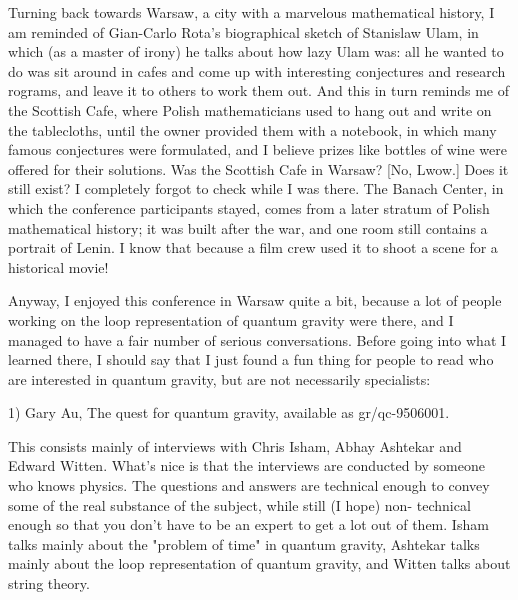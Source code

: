 Turning back towards Warsaw, a city with a marvelous mathematical 
history, I am reminded of Gian-Carlo Rota's biographical sketch of 
Stanislaw Ulam, in which (as a master of irony) he talks about how lazy
Ulam was: all he wanted to do was sit around in cafes and come up with
interesting conjectures and research rograms, and leave it to others to 
work them out.  And this in turn reminds me of the Scottish Cafe, where 
Polish mathematicians used to hang out and write on the tablecloths, 
until the owner provided them with a notebook, in which many
famous conjectures were formulated, and I believe prizes like bottles of 
wine were offered for their solutions.  Was the Scottish Cafe in Warsaw?
[No, Lwow.]  Does it still exist?  I completely forgot to check while 
I was there.  The Banach Center, in which the conference participants 
stayed, comes from a later stratum of Polish mathematical history; 
it was built after the war, and one room still contains a portrait 
of Lenin.  I know that because a film crew used it to shoot a 
scene for a historical movie!

Anyway, I enjoyed this conference in Warsaw quite a bit, because a lot
of people working on the loop representation of quantum gravity were
there, and I managed to have a fair number of serious conversations.
Before going into what I learned there, I should say that I just found a 
fun thing for people to read who are interested in quantum gravity, but 
are not necessarily specialists:

1)  Gary Au, The quest for quantum gravity, available as gr/qc-9506001.

This consists mainly of interviews with Chris Isham, Abhay Ashtekar and
Edward Witten.  What's nice is that the interviews are conducted by someone
who knows physics. The questions and answers are technical enough to
convey some of the real substance of the subject, while still (I hope) non-
technical enough so that you don't have to be an expert to get a lot out of 
them.  Isham talks mainly about the "problem of time" in quantum gravity, 
Ashtekar talks mainly about the loop representation of quantum gravity, 
and Witten talks about string theory.

